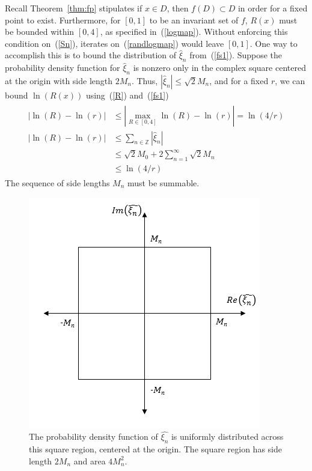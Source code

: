 Recall Theorem~\ref{thm:fp} stipulates if $x \in D$, then $f(D) \subset
D$ in order for a fixed point to exist. Furthermore, for $[0,1]$ to be an invariant set of $f$, $R(x)$
must be bounded within $[0,4]$, as specified in~(\ref{logmap}). Without enforcing this condition
on~(\ref{Sn}), iterates on~(\ref{randlogmap}) would leave $[0,1]$. One way to accomplish this is to bound
the distribution of $\hat{\xi}_n$ from~(\ref{fs1}). Suppose the probability density
function for $\hat{\xi}_n$ is nonzero only in the complex square centered at the
origin with side length $2M_n$. Thus, $|\hat{\xi}_n| \leq
\sqrt{2}M_n$, and for a fixed $r$, we
can bound $\ln(R(x))$ using~(\ref{R}) and~(\ref{fs1})
\begin{align}
\begin{split}\label{bdnr}
|\ln(R)-\ln(r)|&\leq |\max_{R\in [0,4]}\ln(R) - \ln(r)|=\ln(4/r)\\
|\ln(R)-\ln(r)|&\leq \sum_{n\in \mathbb{Z}}|\hat{\xi}_n| \\
&\leq \sqrt{2}M_0+2\sum_{n=1}^\infty \sqrt{2}M_n\\
&\leq \ln(4/r)
\end{split}
\end{align}
The sequence of side lengths $M_n$ must be summable. 
\begin{figure}[!h]
\caption[Uniform Distribution over a Square Region]{The probability
  density function of $\hat{\xi_n}$ is uniformly distributed across
  this square region, centered at the origin. The square region has
  side length $2M_n$ and area $4M_n^2$.}\label{fig:square}
	\begin{center}
		\includegraphics[scale=0.7]{figs/square.png}
	\end{center}
\end{figure}
